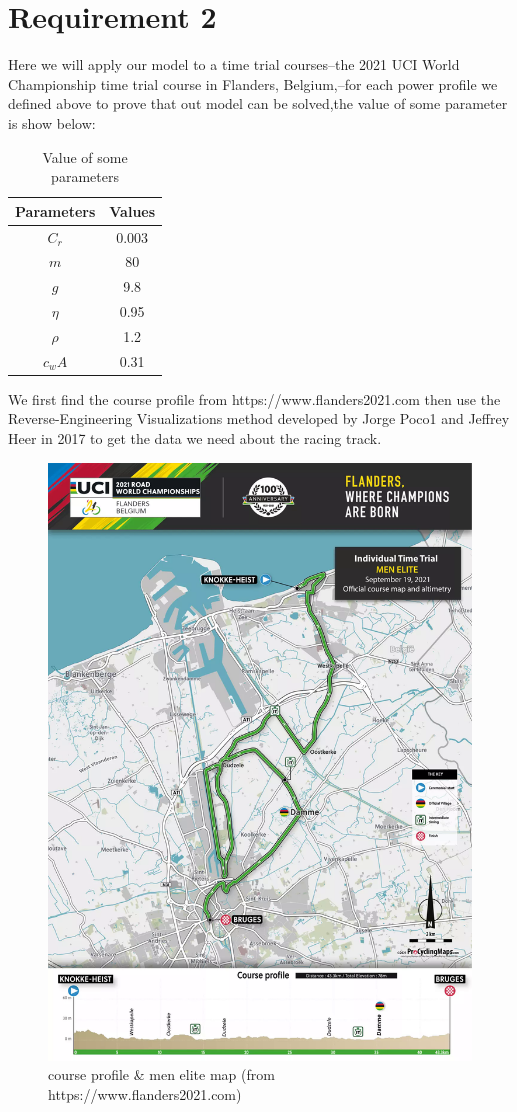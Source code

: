 \documentclass[12pt]{article}
\begin{document}
\section{Requirement 2}
Here we will apply our model to a time trial courses--the 2021 UCI World Championship time trial course in Flanders, Belgium,--for each power profile we defined
above to prove that out model can be solved,the value of some parameter is show below:
\begin{table}[H]
    \centering
    \begin{tabular}{cc}
        \toprule
        \bf Parameters & \bf Values \\
        \midrule
        $C_r$          & 0.003      \\
        $m$            & 80         \\
        $g$            & 9.8        \\
        $\eta $        & 0.95       \\
        $\rho  $       & 1.2        \\
        $c_wA$         & 0.31       \\
        \bottomrule
    \end{tabular}
    \caption{Value of some parameters}
\end{table}
We first find the course profile from https://www.flanders2021.com
then use the Reverse-Engineering Visualizations method developed by Jorge Poco1 and Jeffrey Heer in 2017\cite{poco2017reverse} to get the data we need about the racing track.
\begin{figure}
    \centering
    \includegraphics[width=0.6\columnwidth]{men-elite-individual-time-trial-map}
    \caption{course profile \& men elite map (from https://www.flanders2021.com)}
    \label{figure}
\end{figure}
\end{document}
